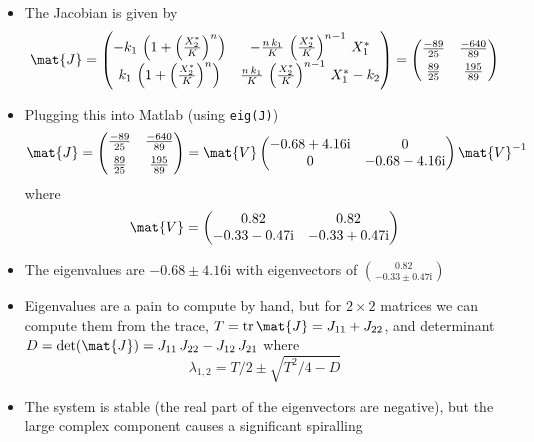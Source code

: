 \documentclass[11pt]{article}
\newcommand{\ii}{\mathrm{i}}
\begin{document}
\begin{itemize}
\begin{itemize}
$$       \frac{k_0}{k_2}\right) = \left(\frac{200}{89},
       \frac{8}{5}\right) $$
\item The Jacobian is given by
\begin{align*}
 \mat{J}=
 \begin{pmatrix}
  -k_1\,\left(1+\left(\frac{X_2^*}{K}\right)^n\right) & 
- \frac{n\, k_1}{K}\,\left(\frac{X_2^*}{K}\right)^{n-1}\,X_1^* \\
 k_1\,\left(1+\left(\frac{X_2^*}{K}\right)^n\right) & 
 \frac{n\, k_1}{K}\,\left(\frac{X_2^*}{K}\right)^{n-1}\,X_1^* - k_2
\end{pmatrix} =
\begin{pmatrix}
\frac{-89}{25} & \frac{-640}{89}\\
\rule{0pt}{3ex} \frac{89}{25} & \frac{195}{89}
\end{pmatrix}
\end{align*}
\item Plugging this into Matlab (using \texttt{eig(J)})
\begin{align*}
\mat{J} =
\begin{pmatrix}
 \frac{-89}{25} & \frac{-640}{89}\\
 \rule{0pt}{3ex} \frac{89}{25} & \frac{195}{89}
\end{pmatrix}
= \mat{V}
\begin{pmatrix}
 -0.68 + 4.16\ii & 0 \\
 0  &  -0.68 - 4.16\ii
\end{pmatrix}
\mat{V}^{-1}
\end{align*}
where
\begin{align*}
\mat{V} = \begin{pmatrix}
 0.82 &   0.82 \\
 -0.33 - 0.47\ii  & -0.33 + 0.47\ii 
\end{pmatrix}
\end{align*}
\item The eigenvalues are \(-0.68 \pm 4.16\ii\) with eigenvectors of
\(\binom{0.82}{-0.33\pm0.47\ii}\)
\item Eigenvalues are a pain to compute by hand, but for \(2\times2\)
matrices we can compute them from the trace, \(T =
       \mathop{\mathrm{tr}} \mat{J} = J_{11} + J_{22}\), and determinant \(D=
       \det(\mat{J})=J_{11}\,J_{22}-J_{12}\,J_{21}\) where
$$ \lambda_{1,2} = T/2 \pm \sqrt{T^{2}/4-D} $$
\item The system is stable (the real part of the eigenvectors are
negative), but the  large complex component causes a
significant spiralling
\end{itemize}
\end{itemize}
\end{document}
